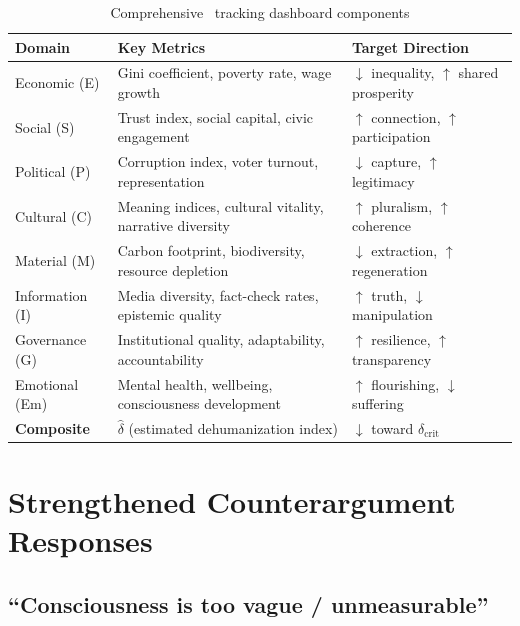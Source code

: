 \documentclass[11pt,a4paper]{article}
\theoremstyle{definition}
\theoremstyle{remark}
\begin{document}
\begin{table}[H]
\centering
\caption{Comprehensive \SESES\ tracking dashboard components}
\label{tab:seses_dashboard}
\renewcommand{\arraystretch}{1.15}
\begin{tabularx}{\linewidth}{@{}lXX@{}}
\toprule
\textbf{Domain} & \textbf{Key Metrics} & \textbf{Target Direction} \\
\midrule
Economic (E) & Gini coefficient, poverty rate, wage growth & $\downarrow$ inequality, $\uparrow$ shared prosperity \\
Social (S) & Trust index, social capital, civic engagement & $\uparrow$ connection, $\uparrow$ participation \\
Political (P) & Corruption index, voter turnout, representation & $\downarrow$ capture, $\uparrow$ legitimacy \\
Cultural (C) & Meaning indices, cultural vitality, narrative diversity & $\uparrow$ pluralism, $\uparrow$ coherence \\
Material (M) & Carbon footprint, biodiversity, resource depletion & $\downarrow$ extraction, $\uparrow$ regeneration \\
Information (I) & Media diversity, fact-check rates, epistemic quality & $\uparrow$ truth, $\downarrow$ manipulation \\
Governance (G) & Institutional quality, adaptability, accountability & $\uparrow$ resilience, $\uparrow$ transparency \\
Emotional (Em) & Mental health, wellbeing, consciousness development & $\uparrow$ flourishing, $\downarrow$ suffering \\
\midrule
\textbf{Composite} & $\hat{\delta}$ (estimated dehumanization index) & $\downarrow$ toward $\delta_{\text{crit}}$ \\
\bottomrule
\end{tabularx}
\end{table}

\section{Strengthened Counterargument Responses}
\label{app:counterarguments_extended}

\subsection{``Consciousness is too vague / unmeasurable''}
\end{document}
